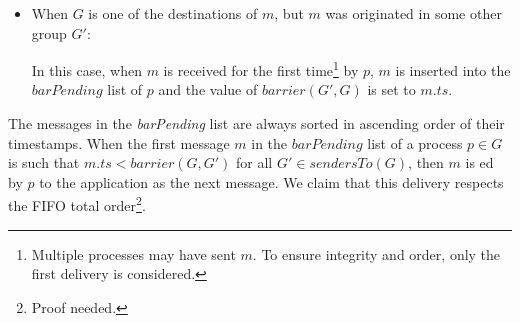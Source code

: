 \documentclass[times, 10pt]{article}
\begin{document}
\begin{itemize}
  
  \item When $G$ is one of the destinations of $m$, but $m$ was originated in some other group $G'$:
  
  In this case, when $m$ is received for the first time\footnote{Multiple processes may have sent $m$. To ensure integrity and order, only the first delivery is considered.} by $p$, $m$ is inserted into the $barPending$ list of $p$ and the value of $barrier(G',G)$ is set to $m.ts$.
\end{itemize}

The messages in the \textit{barPending} list are always sorted in ascending order of their timestamps. When the first message $m$ in the $barPending$ list of a process $p \in G$ is such that $m.ts < barrier(G, G')$ for all $G' \in sendersTo(G)$, then $m$ is \cons{}ed by $p$ to the application as the next message. We claim that this delivery respects the FIFO total order\footnote{Proof needed.}.

\end{document}
